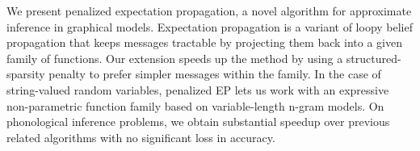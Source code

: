 We present penalized expectation propagation, a novel algorithm for approximate inference in graphical models. Expectation propagation is a variant of loopy belief propagation that keeps messages tractable by projecting them back into a given family of functions. Our extension speeds up the method by using a structured-sparsity penalty to prefer simpler messages within the family.  In the case of string-valued random variables, penalized EP lets us work with an expressive non-parametric function family based on variable-length n-gram models. On phonological inference problems, we obtain substantial speedup over previous related algorithms with no significant loss in accuracy.
